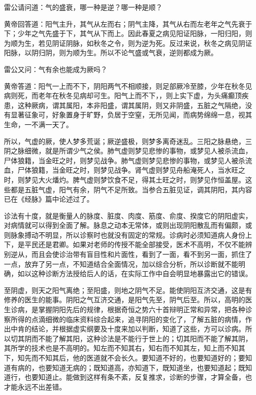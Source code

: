 \documentclass[12pt,UTF8]{ctexbook}
\begin{document}
雷公请问道：气的盛衰，哪一种是逆？哪一种是顺？

黄帝回答道：阳气主升，其气从左而右；阴气主降，其气从右而左老年之气先衰于下；少年之气先盛于下，其气从下而上。因此春夏之病见阳证阳脉，一阳归阳，则为顺为生，若见阴证阴脉，如秋冬之令，则为逆为死。反过来说，秋冬之病见阴证阳脉，以阴归阴，则为顺为生。所以不论气盛或气衰，逆则都成为厥。

雷公又问：气有余也能成为厥吗？

黄帝答道：阳气一上而不下，阴阳两气不相顺接，则足部厥冷至膝，少年在秋冬见病则死，而老年在秋冬见病却可生。阳气上而不下，，则上实下虚，为头痛癫顶疾患，这种厥病，谓其属阳，本非阳盛，谓其属阴，则又非阴盛，五脏之气隔绝，没有显著征象可，好象置身于旷野，负居于空窒，无所见闻，而病势绵绵一息，视其生命，一不满一天了。

所以，气虚的厥，使人梦多荒诞；厥逆盛极，则梦多离奇迷乱。三阳之脉悬绝，三阴之脉细微，就是所谓少气之侯。肺气虚则梦见悲惨的事物，或梦见人被杀流血，尸体狼籍，当金旺之时，则梦见战争。肺气虚则梦见悲惨的事物，或梦见人被杀流血，尸体狼籍，当金旺之时，则梦见战争。肾气虚则梦见舟船淹死人，当水旺之时，则梦见大火燔灼。脾气虚则梦饮食不足，得其土旺之时，则梦见作恒盖屋。这些都是五脏气虚，阳气有余，阴气不足所致。当参合五脏见证，调其阴阳，其内容已在《经脉》篇中论述过了。

诊法有十度，就是衡量人的脉度、脏度、肉度、筋度、俞度、揆度它的阴阳虚实，对病情就可以得到全面了解。脉息之动本无常体，或则出现阴阳散乱而有偏颇，或则脉象搏动不明显，所以诊察时也就没有固定的常规。诊病时必须知道病人身份上下，是平民还是君卿。如果对老师的传授不能全部接受，医术不高明，不仅不能辨别逆从，而且会使诊治带有盲目性和片面性，看到了一面，看不到另一面，抓住了一点，放弃了另一点，不知道结合全面情况，加以综合分析，所以诊断就不能明确，如以这种诊断方法授给后人的话，在实际工作中自会明显地暴露出它的错误。

至阴虚，则天之阳气离绝；至阳盛，则地之阴气不足。能使阴阳互济交通，这是有修养的医生的能事。阴阳之气互济交通，是阳气先至，阴气后至。所以，高明的医生诊病，是掌握阴阳先后的规律，根据奇恒之势六十首辩明正常和异常，把各种诊察所得的点滴细微的临床资料综合起来，追寻阴阳的变化了，了解五脏的病情，作出中肯的结论，并根据虚实纲要及十度来加以判断，知道了这些，方可以诊病。所以切其阴而不能了解其阳，这种诊法是不能行于世上的；切其阳而不能了解其阴，其所学的技术也是不高明的。知左而不知其右，知右而不知其左，知上而不知其下，知先而不知其后，他的医道就不会长久。要知道不好的，也要知道好的；要知道有病的，也要知道无病的；既知道高，亦知道下，既知道坐，也要知道起；既知道行，也要知道止。能做到这样有条不紊，反复推求，诊断的步骤，才算全备，也才能永远不出差错。
\end{document}

